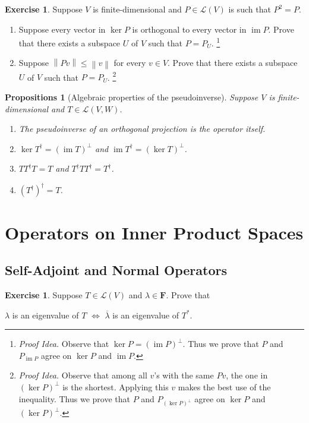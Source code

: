 \documentclass[nofonts,colorlinks]{tufte-handout}
\theoremstyle{plain} %
\newtheorem{props}[thm]{Propositions}
\theoremstyle{definition}
\newtheorem{exer}[thm]{Exercise}
\theoremstyle{remark}
\def\idea{\textit{\color[rgb]{0,0,.55}Proof Idea. }}
\newcommand{\bra}[1]{\mathopen{}\left(#1\right)}
\newcommand{\norm}[1]{\mathopen{}\left\lVert#1\right\rVert}
\newcommand{\F}{\mathbf{F}}
\renewcommand{\L}{\mathcal{L}}
\DeclareMathOperator{\im}{im}
\begin{document}
\begin{exer}
	Suppose $V$ is finite-dimensional and  $P\in\L(V)$ is such that $P^2=P$.
	\begin{enumerate}
		\item Suppose every vector in $\ker P$ is orthogonal to every vector in $\im P$. Prove that there exists a subspace $U$ of $V$ such that $P=P_U$.%
		\footnote{\idea Observe that $\ker P=(\im P)^\perp$. Thus we prove that $P$ and $P_{\im P}$ agree on $\ker P$ and $\im P$.}
		\item Suppose $\norm{Pv}\leq\norm{v}$ for every $v\in V$. Prove that there exists a subspace $U$ of $V$ such that $P=P_U$.%
		\footnote{\idea Observe that among all $v$'s with the same $Pv$, the one in $(\ker P)^\perp$ is the shortest. Applying this $v$ makes the best use of the inequality. Thus we prove that $P$ and $P_{(\ker P)^\perp}$ agree on $\ker P$ and $(\ker P)^\perp$.}
	\end{enumerate}
\end{exer}

\begin{props}[Algebraic properties of the pseudoinverse]
	Suppose $V$ is finite-dimensional and $T\in\L(V,W)$.
	\begin{enumerate}
		\item The pseudoinverse of an orthogonal projection is the operator itself.
		\item $\ker T^\dagger=(\im T)^\perp$ and $\im T^\dagger=(\ker T)^\perp$.
		\item $TT^\dagger T=T$ and $T^\dagger TT^\dagger=T^\dagger$.
		\item $\bra{T^\dagger}^\dagger=T$.
	\end{enumerate}
\end{props}


\section{Operators on Inner Product Spaces}
\subsection{Self-Adjoint and Normal Operators}
\begin{exer}
	Suppose $T\in\L(V)$ and $\lambda\in\F$. Prove that
	\begin{center}
		$\lambda$ is an eigenvalue of $T$ $\iff$ $\overline{\lambda}$ is an eigenvalue of $T^*$.
	\end{center}
\end{exer}
\end{document}
